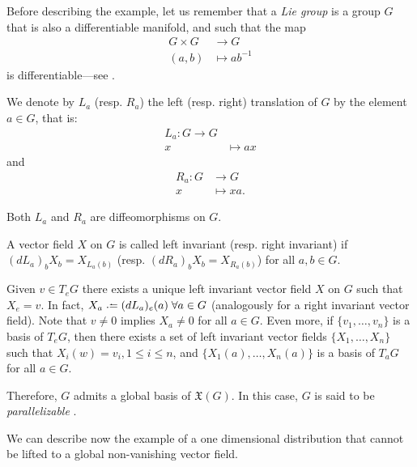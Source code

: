 \begin{remark}
	Before describing the example, let us remember that a \emph{Lie group} is a group $G$ that is also a differentiable manifold, and such that the map
	\begin{align*}
		G \times G &\to G \\
		(a,b) &\mapsto ab^{-1}
	\end{align*}
	is differentiable---see \cite[p. 38]{kobnom63}.
	
	We denote by $L_a$ (resp. $R_a$) the left (resp. right) translation of $G$ by the element $a\in G$, that is:
	\begin{align*}
		L_a \colon G \to G \\
		x &\mapsto ax
	\end{align*}
	and
	\begin{align*}
		R_a \colon G &\to G \\
		x &\mapsto xa.
	\end{align*}

	Both $L_a$ and $R_a$ are diffeomorphisms on $G$.
	
	A vector field $X$ on $G$ is called left invariant (resp. right invariant) if $(dL_a)_b X_b = X_{L_a(b)}$ (resp. $(dR_a)_b X_b = X_{R_a(b)}$) for all $a,b \in G$.
	
	Given $v \in T_e G$ there exists a unique left invariant vector field $X$ on $G$ such that $X_e = v$. In fact, $X_a \defeq (dL_a)_e(a) \; \forall a \in G$ (analogously for a right invariant vector field). Note that $v \neq 0$ implies $X_a \neq 0$ for all $a \in G$. Even more, if $\{v_1, \dots, v_n\}$ is a basis of $T_e G$, then there exists a set of left invariant vector fields $\{X_1, \dots, X_n\}$ such that $X_i(w) = v_i, 1 \leq i \leq n$, and  $\{X_1(a), \dots, X_n(a)\}$ is a basis of $T_a G$ for all $a \in G$.
	
	Therefore, $G$ admits a global basis of $\mathfrak{X}(G)$. In this case, $G$ is said to be \emph{parallelizable} \cite[Ch. 1, Sec. 4]{kobnom63}.
\end{remark}

We can describe now the example of a one dimensional distribution that cannot be lifted to a global non-vanishing vector field.


